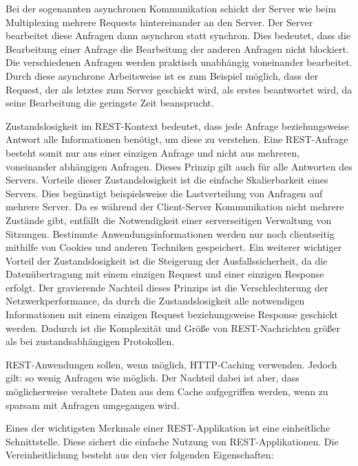 Bei der sogenannten asynchronen Kommunikation schickt der Server wie beim Multiplexing mehrere Requests hintereinander an den Server. Der Server bearbeitet diese Anfragen dann asynchron statt synchron. Dies bedeutet, dass die Bearbeitung einer Anfrage die Bearbeitung der anderen Anfragen nicht blockiert. Die verschiedenen Anfragen werden praktisch unabhängig voneinander bearbeitet. Durch diese asynchrone Arbeitsweise ist es zum Beispiel möglich, dass der Request, der als letztes zum Server geschickt wird, als erstes beantwortet wird, da seine Bearbeitung die geringste Zeit beansprucht. \cite{ClientServer}


Zustandslosigkeit im REST-Kontext bedeutet, dass jede Anfrage beziehungsweise Antwort alle Informationen benötigt, um diese zu verstehen. Eine REST-Anfrage besteht somit nur aus einer einzigen Anfrage und nicht aus mehreren, voneinander abhängigen Anfragen. Dieses Prinzip gilt auch für alle Antworten des Servers. Vorteile dieser Zustandslosigkeit ist die einfache Skalierbarkeit eines Servers. Dies begünstigt beispielsweise die Lastverteilung von Anfragen auf mehrere Server. Da es während der Client-Server Kommunikation nicht mehrere Zustände gibt, entfällt die Notwendigkeit einer serverseitigen Verwaltung von Sitzungen. Bestimmte Anwendungsinformationen werden nur noch clientseitig mithilfe von Cookies und anderen Techniken gespeichert. Ein weiterer wichtiger Vorteil der Zustandslosigkeit ist die Steigerung der Ausfallssicherheit, da die Datenübertragung mit einem einzigen Request und einer einzigen Response erfolgt. Der gravierende Nachteil dieses Prinzips ist die Verschlechterung der Netzwerkperformance, da durch die Zustandslosigkeit alle notwendigen Informationen mit einem einzigen Request beziehungsweise Response geschickt werden. Dadurch ist die Komplexität und Größe von REST-Nachrichten größer als bei zustandsabhängigen Protokollen. \cite{WikiREST}


REST-Anwendungen sollen, wenn möglich, HTTP-Caching verwenden. Jedoch gilt: so wenig Anfragen wie möglich. Der Nachteil dabei ist aber, dass möglicherweise veraltete Daten aus dem Cache aufgegriffen werden, wenn zu sparsam mit Anfragen umgegangen wird. \cite{WikiREST}


Eines der wichtigsten Merkmale einer REST-Applikation ist eine einheitliche Schnittstelle. Diese sichert die einfache Nutzung von REST-Applikationen. Die Vereinheitlichung besteht aus den vier folgenden Eigenschaften:


